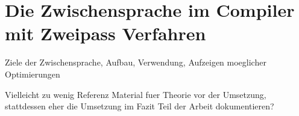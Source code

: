 \chapter{Die Zwischensprache im Compiler mit Zweipass Verfahren}
\label{chap:theory:inBetweenLayer}

Ziele der Zwischensprache, Aufbau, Verwendung, Aufzeigen moeglicher Optimierungen

Vielleicht zu wenig Referenz Material fuer Theorie vor der Umsetzung, stattdessen eher die Umsetzung im Fazit Teil der Arbeit dokumentieren?
